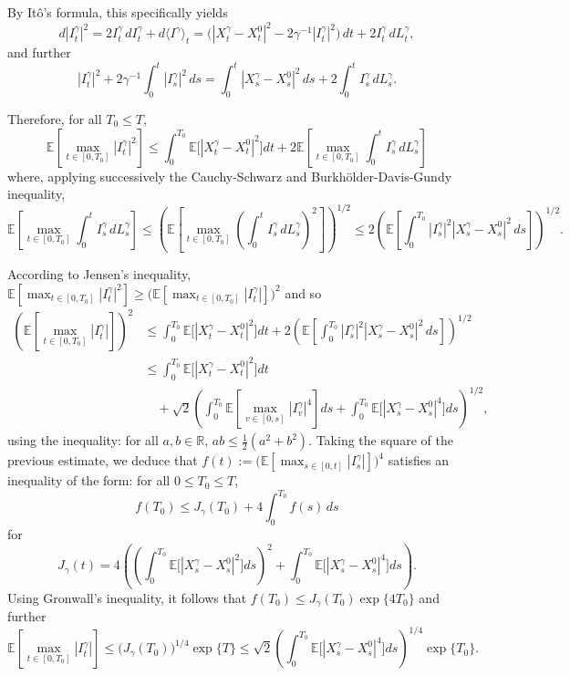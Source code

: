 \documentclass[11pt]{article}
\begin{document}
By It\^o's formula, this specifically yields
\[
d|I_t^{\gamma}|^2=2I_t^{\gamma}\,dI_t^{\gamma}+d\langle I^{\gamma}\rangle_t
=\bigl(|X_t^{\gamma}-X_t^0|^2-2\gamma^{-1}|I_t^{\gamma}|^2\bigr)\,dt+2I_t^{\gamma}\,dL_t^{\gamma},
\]
and further
\[
|I_t^{\gamma}|^2+2\gamma^{-1}\int_0^t |I_s^{\gamma}|^2\,ds
=\int_0^t |X_s^{\gamma}-X_s^0|^2\,ds+2\int_0^t I_s^{\gamma}\,dL_s^{\gamma}.
\]

Therefore, for all $T_0\le T$,
\[
\mathbb{E}\left[\max_{t\in[0,T_0]}|I_t^{\gamma}|^2\right]
\le \int_0^{T_0}\mathbb{E}\bigl[|X_t^{\gamma}-X_t^0|^2\bigr]dt
+2\mathbb{E}\left[\max_{t\in[0,T_0]}\int_0^t I_s^{\gamma}\,dL_s^{\gamma}\right]
\]
where, applying successively the Cauchy-Schwarz and Burkh\"older-Davis-Gundy inequality,
\begin{equation}
\label{eq:3.13}
\mathbb{E}\left[\max_{t\in[0,T_0]}\int_0^t I_s^{\gamma}\,dL_s^{\gamma}\right]
\le \left(\mathbb{E}\left[\max_{t\in[0,T_0]}\left(\int_0^t I_s^{\gamma}\,dL_s^{\gamma}\right)^2\right]\right)^{1/2}
\le 2\left(\mathbb{E}\left[\int_0^{T_0}|I_s^{\gamma}|^2|X_s^{\gamma}-X_s^0|^2\,ds\right]\right)^{1/2}.
\end{equation}

According to Jensen's inequality, $\mathbb{E}[\max_{t\in[0,T_0]}|I_t^{\gamma}|^2]\ge \bigl(\mathbb{E}[\max_{t\in[0,T_0]}|I_t^{\gamma}|]\bigr)^2$ and so
\[
\begin{aligned}
\left(\mathbb{E}\left[\max_{t\in[0,T_0]}|I_t^{\gamma}|\right]\right)^2
&\le \int_0^{T_0}\mathbb{E}\bigl[|X_t^{\gamma}-X_t^0|^2\bigr]dt+2\left(\mathbb{E}\left[\int_0^{T_0}|I_s^{\gamma}|^2|X_s^{\gamma}-X_s^0|^2\,ds\right]\right)^{1/2} \\
&\le \int_0^{T_0}\mathbb{E}\bigl[|X_t^{\gamma}-X_t^0|^2\bigr]dt \\
&\quad +\sqrt{2}\left(\int_0^{T_0}\mathbb{E}\left[\max_{v\in[0,s]}|I_v^{\gamma}|^4\right]ds+\int_0^{T_0}\mathbb{E}\bigl[|X_s^{\gamma}-X_s^0|^4\bigr]ds\right)^{1/2},
\end{aligned}
\]
using the inequality: for all $a,b\in\mathbb{R}$, $ab\le \tfrac12(a^2+b^2)$.
Taking the square of the previous estimate, we deduce that
$f(t):=\bigl(\mathbb{E}[\max_{s\in[0,t]}|I_s^{\gamma}|]\bigr)^4$ satisfies an inequality of the form: for all $0\le T_0\le T$,
\[
f(T_0)\le J_{\gamma}(T_0)+4\int_0^{T_0}f(s)\,ds
\]
for
\[
J_{\gamma}(t)=4\left(\left(\int_0^{T_0}\mathbb{E}\bigl[|X_s^{\gamma}-X_s^0|^2\bigr]ds\right)^2+\int_0^{T_0}\mathbb{E}\bigl[|X_s^{\gamma}-X_s^0|^4\bigr]ds\right).
\]
Using Gronwall's inequality, it follows that $f(T_0)\le J_{\gamma}(T_0)\exp\{4T_0\}$ and further
\[
\mathbb{E}\left[\max_{t\in[0,T_0]}|I_t^{\gamma}|\right]
\le \bigl(J_{\gamma}(T_0)\bigr)^{1/4}\exp\{T\}
\le \sqrt{2}\left(\int_0^{T_0}\mathbb{E}\bigl[|X_s^{\gamma}-X_s^0|^4\bigr]ds\right)^{1/4}\exp\{T_0\}.
\]
\end{document}
